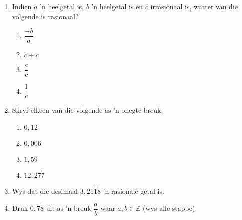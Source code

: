 \begin{eocexercises}{}


\begin{enumerate}[itemsep=5pt, label=\textbf{\arabic*}. ] 
\item Indien $a$ ’n heelgetal is, $b$ ’n heelgetal is en $c$ irrasionaal is, watter van die volgende is rasionaal?
    \begin{enumerate}[itemsep=5pt, label=\textbf{\alph*}. ] 
    \item $\dfrac{-b}{a}$
    \item $c \div c$
    \item $\dfrac{a}{c}$
    \item $\dfrac{1}{c}$
    \end{enumerate}
\item Skryf elkeen van die volgende as ’n onegte breuk:
    \begin{enumerate}[itemsep=5pt, label=\textbf{\alph*}. ] 
    \item $0,12$
    \item $0,006$
    \item $1,59$
    \item $12,27\dot{7}$
    \end{enumerate}
\item Wys dat die desimaal $3,21\dot{1}\dot{8}$ ’n rasionale getal is.
\item Druk  $0,7\dot{8}$ uit as ’n breuk $\dfrac{a}{b}$ waar $a,b\in \mathbb{Z}$ (wys alle stappe).




\end{enumerate}
\end{eocexercises}

